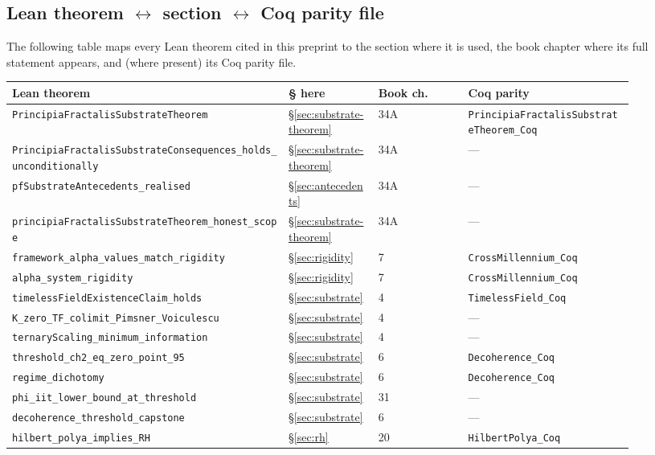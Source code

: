 \documentclass[11pt,a4paper]{article}
\theoremstyle{definition}
\theoremstyle{remark}
\newcommand{\lean}[1]{\texttt{\small #1}}
\begin{document}
\subsection{Lean theorem $\leftrightarrow$ section $\leftrightarrow$ Coq parity file}

The following table maps every Lean theorem cited in this preprint
to the section where it is used, the book chapter where its
full statement appears, and (where present) its Coq parity file.

\begin{longtable}{p{0.40\linewidth} p{0.13\linewidth} p{0.13\linewidth} p{0.24\linewidth}}
\toprule
\textbf{Lean theorem} & \textbf{\S{} here} & \textbf{Book ch.} & \textbf{Coq parity} \\
\midrule
\endhead
\lean{PrincipiaFractalisSubstrateTheorem} & \S\ref{sec:substrate-theorem} & 34A & \lean{PrincipiaFractalisSubstrateTheorem\_Coq} \\
\lean{PrincipiaFractalisSubstrateConsequences\_holds\_unconditionally} & \S\ref{sec:substrate-theorem} & 34A & --- \\
\lean{pfSubstrateAntecedents\_realised} & \S\ref{sec:antecedents} & 34A & --- \\
\lean{principiaFractalisSubstrateTheorem\_honest\_scope} & \S\ref{sec:substrate-theorem} & 34A & --- \\
\lean{framework\_alpha\_values\_match\_rigidity} & \S\ref{sec:rigidity} & 7 & \lean{CrossMillennium\_Coq} \\
\lean{alpha\_system\_rigidity} & \S\ref{sec:rigidity} & 7 & \lean{CrossMillennium\_Coq} \\
\lean{timelessFieldExistenceClaim\_holds} & \S\ref{sec:substrate} & 4 & \lean{TimelessField\_Coq} \\
\lean{K\_zero\_TF\_colimit\_Pimsner\_Voiculescu} & \S\ref{sec:substrate} & 4 & --- \\
\lean{ternaryScaling\_minimum\_information} & \S\ref{sec:substrate} & 4 & --- \\
\lean{threshold\_ch2\_eq\_zero\_point\_95} & \S\ref{sec:substrate} & 6 & \lean{Decoherence\_Coq} \\
\lean{regime\_dichotomy} & \S\ref{sec:substrate} & 6 & \lean{Decoherence\_Coq} \\
\lean{phi\_iit\_lower\_bound\_at\_threshold} & \S\ref{sec:substrate} & 31 & --- \\
\lean{decoherence\_threshold\_capstone} & \S\ref{sec:substrate} & 6 & --- \\
\lean{hilbert\_polya\_implies\_RH} & \S\ref{sec:rh} & 20 & \lean{HilbertPolya\_Coq} \\

\end{longtable}
\end{document}
